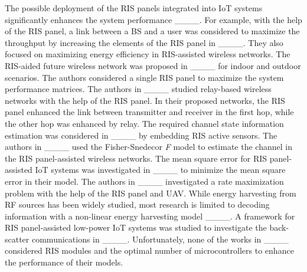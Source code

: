 The possible deployment of the RIS panels integrated into IoT systems significantly enhances the system performance ____.
For example, with the help of the RIS panel, a link between a BS and a user was considered to maximize the throughput by increasing the elements of the RIS panel in ____.
They also focused on maximizing energy efficiency in RIS-assisted wireless networks.
The RIS-aided future wireless network was proposed in ____ for indoor and outdoor scenarios.
The authors considered a single RIS panel to maximize the system performance matrices.
The authors in ____ studied relay-based wireless networks with the help of the RIS panel.
In their proposed networks, the RIS panel enhanced the link between transmitter and receiver in the first hop, while the other hop was enhanced by relay.
The required channel state information estimation was considered in ____ by embedding RIS active sensors.
The authors in ____ used the Fisher-Snedecor \textit{F} model to estimate the channel in the RIS panel-assisted wireless networks.
The mean square error for RIS panel-assisted IoT systems was investigated in ____ to minimize the mean square error in their model.
The authors in ____ investigated a rate maximization problem with the help of the RIS panel and UAV.
While energy harvesting from RF sources has been widely studied, most research is limited to decoding information with a non-linear energy harvesting model ____.
A framework for RIS panel-assisted low-power IoT systems was studied to investigate the back-scatter communications in ____.
Unfortunately, none of the works in ____ considered RIS modules and the optimal number of microcontrollers to enhance the performance of their models.